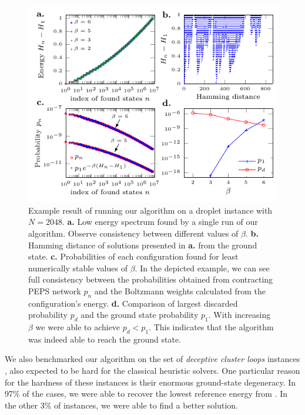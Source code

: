 \begin{figure}
  \includegraphics[width=\textwidth]{figures/tn-single-state_overlay.pdf}
  \caption{Example result of running our algorithm on a droplet instance with $N=2048$.
    \textbf{a.} Low energy spectrum found by a single run of our algorithm. Observe
    consistency between different values of $\beta$. \textbf{b.} Hamming distance
    of solutions presented in \textbf{a.} from the ground state. \textbf{c.}
    Probabilities of each configuration found for least numerically stable values
    of $\beta$. In the depicted example, we can see full consistency between the
    probabilities obtained from contracting PEPS network $p_{n}$ and the Boltzmann
    weights calculated from the configuration's energy. \textbf{d.} Comparison of
    largest discarded probability $p_{d}$ and the ground state probability $p_{1}$.
    With increasing $\beta$ we were able to achieve $p_{d} < p_{1}$. This indicates
    that the algorithm was indeed able to reach the ground state. }
  \label{fig:tn-single-state}
\end{figure}

We also benchmarked our algorithm on the set of \emph{deceptive cluster loops}
instances \cite{helmut_deceptive_2018}, also expected to be hard for the
classical heuristic solvers. One particular reason for the hardness of these
instances is their enormous ground-state degeneracy. In 97\% of the cases, we
were able to recover the lowest reference energy from
\cite{helmut_deceptive_2018}. In the other 3\% of instances, we were able to
find a better solution.

